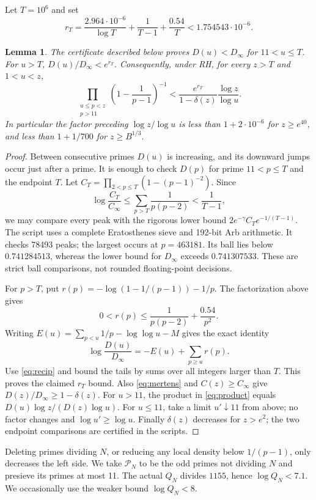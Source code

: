 \documentclass[11pt]{article}
\newtheorem{lemma}[theorem]{Lemma}
\newcommand{\PP}{\mathcal P_N}
\begin{document}
Let $T=10^6$ and set
\[
r_T=\frac{2.964\cdot10^{-6}}{\log T}+\frac1{T-1}+\frac{0.54}{T}
<1.754543\cdot10^{-6}.
\]
\begin{lemma}\label{lem:product}
The certificate described below proves $D(u)<D_\infty$ for
$11<u\le T$. For $u>T$, $D(u)/D_\infty<e^{r_T}$.
Consequently, under RH, for every $z>T$ and $1<u<z$,
\begin{equation}\label{eq:product}
\prod_{\substack{u\le p<z\\p>11}}
\left(1-\frac1{p-1}\right)^{-1}
<\frac{e^{r_T}}{1-\delta(z)}\frac{\log z}{\log u}.
\end{equation}
In particular the factor preceding $\log z/\log u$ is less than
$1+2\cdot10^{-6}$ for $z\ge e^{40}$, and less than $1+1/700$
for $z\ge B^{1/3}$.
\end{lemma}
\begin{proof}
Between consecutive primes $D(u)$ is increasing, and its downward
jumps occur just after a prime. It is enough to check $D(p)$ for
prime $11<p\le T$ and the endpoint $T$. Let
$C_T=\prod_{2<p\le T}(1-(p-1)^{-2})$. Since
\[
\log\frac{C_T}{C_\infty}
\le\sum_{p>T}\frac1{p(p-2)}<\frac1{T-1},
\]
we may compare every peak with the rigorous lower bound
$2e^{-\gamma}C_Te^{-1/(T-1)}$.
The script 
uses a complete Eratosthenes sieve and 192-bit Arb arithmetic.
It checks 78493 peaks; the largest occurs at $p=463181$. Its ball
lies below $0.741284513$, whereas the lower bound for
$D_\infty$ exceeds $0.741307533$. These are strict ball comparisons,
not rounded floating-point decisions.

For $p>T$, put
$r(p)=-\log(1-1/(p-1))-1/p$. The factorization above gives
\[
0<r(p)\le\frac1{p(p-2)}+\frac{0.54}{p^2}.
\]
Writing $E(u)=\sum_{p<u}1/p-\log\log u-M$ gives the exact identity
\[
\log\frac{D(u)}{D_\infty}=-E(u)+\sum_{p\ge u}r(p).
\]
Use \eqref{eq:recip} and bound the tails by sums over all integers
larger than $T$. This proves the claimed $r_T$ bound.
Also \eqref{eq:mertens} and $C(z)\ge C_\infty$ give
$D(z)/D_\infty\ge1-\delta(z)$. For $u>11$, the product in
\eqref{eq:product} equals $D(u)\log z/(D(z)\log u)$.
For $u\le11$, take a limit $u'\downarrow11$ from above; no factor
changes and $\log u'\ge\log u$. Finally $\delta(z)$ decreases
for $z>e^2$; the two endpoint comparisons are certified in the scripts.
\end{proof}

Deleting primes dividing $N$, or reducing any local density below
$1/(p-1)$, only decreases the left side. We take $\PP$ to be the
odd primes not dividing $N$ and presieve its primes at most 11.
The actual $Q_N$ divides $1155$, hence $\log Q_N<7.1$.
We occasionally use the weaker bound $\log Q_N<8$.
\end{document}
